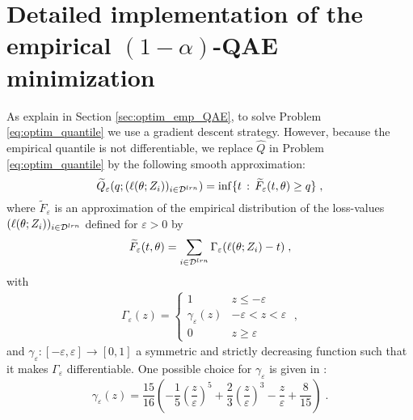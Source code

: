 \section{Detailed implementation of the empirical $(1-\alpha)$-QAE minimization}\label{sec:optim_append}

As explain in Section \ref{sec:optim_emp_QAE}, to solve Problem \eqref{eq:optim_quantile} we use a gradient descent strategy. However, because the empirical quantile is not differentiable, we replace $\widehat{Q}$ in Problem \eqref{eq:optim_quantile} by the following smooth approximation:
%
\begin{equation*}
	\widetilde{Q}_{\varepsilon}(q; (\ell(\theta;Z_i))_{i\in{\cal D}^{lrn}}) = \inf \{t \,:\, \widetilde{F}_{\varepsilon}(t, \theta) \geq q \} \; ,
\end{equation*}
%
where $\widetilde{F}_{\varepsilon}$ is an approximation of the empirical distribution of the loss-values $(\ell(\theta;Z_i))_{i\in{\cal D}^{lrn}}$ defined for $\varepsilon > 0$ by
\begin{align*}
	\widetilde{F}_{\varepsilon}(t, \theta) = \sum_{i\in{\cal D}^{lrn}} \Gamma_{\varepsilon}(\ell(\theta;Z_i) - t) \; ,
\end{align*}
%
with
%
\begin{align*}
	\Gamma_{\varepsilon}(z) = \left\{
	\begin{array}{ll}
		1 & z \leq - \varepsilon \\
		\gamma_{\varepsilon}(z) & -\varepsilon < z < \varepsilon \\
		0 & z \geq \varepsilon
	\end{array}
	\right. \; ,
\end{align*}
and $\gamma_{\varepsilon} : [-\varepsilon, \varepsilon] \longrightarrow [0, 1]$ a symmetric and strictly decreasing function such that it makes $\Gamma_{\varepsilon}$ differentiable. One possible choice for $\gamma_{\varepsilon}$ is given in \citep[Eq. (2.6)]{pena2020solving}:
%
\begin{equation}\label{eq:gamma_epsi}
	\gamma_{\varepsilon}(z) = \dfrac{15}{16}\left(-\dfrac{1}{5} \left(\dfrac{z}{\varepsilon}\right)^5 + \dfrac{2}{3}\left(\dfrac{z}{\varepsilon}\right)^3 - \dfrac{z}{\varepsilon} + \dfrac{8}{15} \right) \; .
\end{equation}
%

